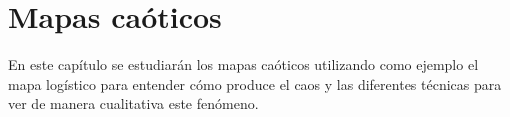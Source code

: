 \chapter{Mapas caóticos}
    
    En este capítulo se estudiarán los mapas caóticos utilizando como ejemplo el mapa logístico para entender cómo produce el caos y las diferentes técnicas para ver de manera cualitativa este fenómeno.

